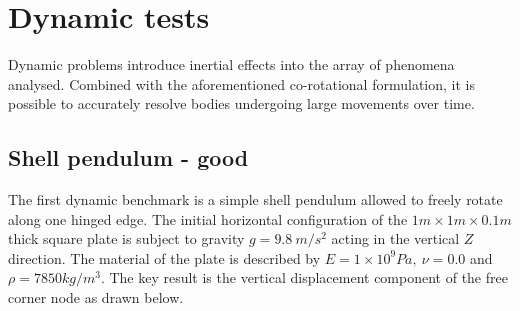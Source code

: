 \section{Dynamic tests}

Dynamic problems introduce inertial effects into the array of phenomena analysed. Combined with the aforementioned co-rotational formulation, it is possible to accurately resolve bodies undergoing large movements over time.

\subsection{Shell pendulum - good}

The first dynamic benchmark is a simple shell pendulum allowed to freely rotate along one hinged edge. The initial horizontal configuration of the $1m\times1m\times0.1m$ thick square plate is subject to gravity $g = 9.8\ m/s^2$ acting in the vertical $Z$ direction. The material of the plate is described by $E = 1\times 10^9 Pa,\ \nu = 0.0$ and $\rho = 7850 kg/m^3$. The key result is the vertical displacement component of the free corner node as drawn below.

